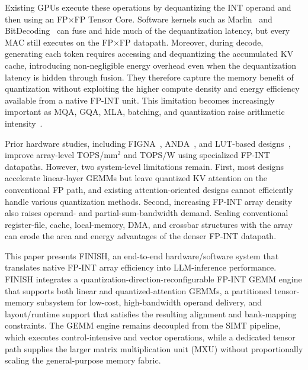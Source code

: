 \documentclass[sigconf,anonymous,nonacm]{acmart}
\newcommand{\ours}{\textsc{FINISH}}
\newcommand{\fpint}{FP-INT}
\begin{document}
Existing GPUs execute these operations by dequantizing the INT operand and then using an FP$\times$FP Tensor Core. Software kernels such as Marlin~\cite{marlin} and BitDecoding~\cite{bitdecoding} can fuse and hide much of the dequantization latency, but every MAC still executes on the FP$\times$FP datapath. 
Moreover, during decode, generating each token requires accessing and dequantizing the accumulated KV cache, introducing non-negligible energy overhead even when the dequantization latency is hidden through fusion.
They therefore capture the memory benefit of quantization without exploiting the higher compute density and energy efficiency available from a native \fpint{} unit. This limitation becomes increasingly important as MQA, GQA, MLA, batching, and quantization raise arithmetic intensity~\cite{mqa,gqa,deepseekai2024deepseekv2strongeconomicalefficient}.

Prior hardware studies, including FIGNA~\cite{figna}, ANDA~\cite{anda}, and LUT-based designs~\cite{figlut,lut_tensor_core}, improve array-level TOPS/mm$^2$ and TOPS/W using specialized \fpint{} datapaths. However, two system-level limitations remain. First, most designs accelerate linear-layer GEMMs but leave quantized KV attention on the conventional FP path, and existing attention-oriented designs cannot efficiently handle various quantization methods. Second, increasing \fpint{} array density also raises operand- and partial-sum-bandwidth demand. Scaling conventional register-file, cache, local-memory, DMA, and crossbar structures with the array can erode the area and energy advantages of the denser \fpint{} datapath.

This paper presents \ours{}, an end-to-end hardware/software system that translates native \fpint{} array efficiency into LLM-inference performance. \ours{} integrates a quantization-direction-reconfigurable \fpint{} GEMM engine that supports both linear and quantized-attention GEMMs, 
a partitioned tensor-memory subsystem for low-cost, high-bandwidth operand delivery,
and layout/runtime support that satisfies the resulting alignment and bank-mapping constraints. The GEMM engine remains decoupled from the SIMT pipeline, which executes control-intensive and vector operations, while a dedicated tensor path supplies the larger matrix multiplication unit (MXU) without proportionally scaling the general-purpose memory fabric\cite{virgo, gemmini}.
\end{document}
